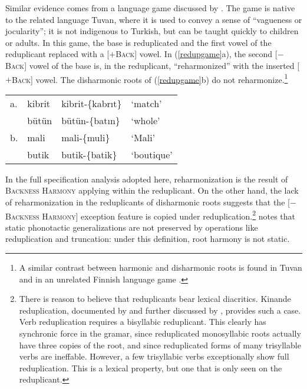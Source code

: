 Similar evidence comes from a language game discussed by \citet{Harrison2001}. The game is native to the related language Tuvan, where it is used to convey a sense of ``vagueness or jocularity''; it is not indigenous to Turkish, but can be taught quickly to children or adults. In this game, the base is reduplicated and the first vowel of the reduplicant replaced with a [$+$\textsc{Back}] vowel. In (\ref{redupgame}a), the second [$-$\textsc{Back}] vowel of the base is, in the reduplicant, ``reharmonized'' with the inserted [$+$\textsc{Back}] vowel. The disharmonic roots of (\ref{redupgame}b) do not reharmonize.\footnote{A similar contrast between harmonic and disharmonic roots is found in Tuvan \citep{Harrison2001} and in an unrelated Finnish language game \citep{Campbell1986}.}

\begin{example} 
\label{redupgame}
\begin{tabular}{llll}
a. & {kibrit} & {kibrit}-\{{kabrıt}\} & `match'    \\
   & {bütün}  & {bütün}-\{{batın}\}   & `whole'    \\
b. & {mali}   & {mali}-\{{muli}\}     & `Mali'     \\
   & {butik}  & {butik}-\{{batik}\}   & `boutique' \\
\end{tabular}
\end{example}

\noindent 
In the full specification analysis adopted here, reharmonization is the result of \textsc{Backness Harmony} applying within the reduplicant. On the other hand, the lack of reharmonization in the reduplicants of disharmonic roots suggests that the [$-$\textsc{Backness Harmony}] exception feature is copied under reduplication.\footnote{There is reason to believe that reduplicants bear lexical diacritics. Kinande reduplication, documented by \citet{Mutaka1990} and further discussed by \citet{Downing2000}, provides such a case. Verb reduplication requires a bisyllabic reduplicant. This clearly has synchronic force in the gramar, since reduplicated monosyllabic roots actually have three copies of the root, and since reduplicated forms of many trisyllable verbs are ineffable. However, a few trisyllabic verbs exceptionally show full reduplication. This is a lexical property, but one that is only seen on the reduplicant.} \citet{Silverman2000} notes that static phonotactic generalizations are not preserved by operations like reduplication and truncation: under this definition, root harmony is not static.

